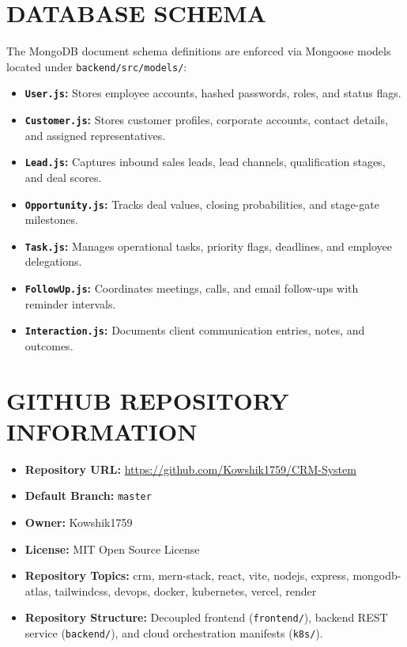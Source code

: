 \chapter{DATABASE SCHEMA}
\label{app:schema}

The MongoDB document schema definitions are enforced via Mongoose models located under \texttt{backend/src/models/}:
\begin{itemize}
    \item \textbf{\texttt{User.js}:} Stores employee accounts, hashed passwords, roles, and status flags.
    \item \textbf{\texttt{Customer.js}:} Stores customer profiles, corporate accounts, contact details, and assigned representatives.
    \item \textbf{\texttt{Lead.js}:} Captures inbound sales leads, lead channels, qualification stages, and deal scores.
    \item \textbf{\texttt{Opportunity.js}:} Tracks deal values, closing probabilities, and stage-gate milestones.
    \item \textbf{\texttt{Task.js}:} Manages operational tasks, priority flags, deadlines, and employee delegations.
    \item \textbf{\texttt{FollowUp.js}:} Coordinates meetings, calls, and email follow-ups with reminder intervals.
    \item \textbf{\texttt{Interaction.js}:} Documents client communication entries, notes, and outcomes.
\end{itemize}

\chapter{GITHUB REPOSITORY INFORMATION}
\label{app:github}

\begin{itemize}
    \item \textbf{Repository URL:} \url{https://github.com/Kowshik1759/CRM-System}
    \item \textbf{Default Branch:} \texttt{master}
    \item \textbf{Owner:} Kowshik1759
    \item \textbf{License:} MIT Open Source License
    \item \textbf{Repository Topics:} crm, mern-stack, react, vite, nodejs, express, mongodb-atlas, tailwindcss, devops, docker, kubernetes, vercel, render
    \item \textbf{Repository Structure:} Decoupled frontend (\texttt{frontend/}), backend REST service (\texttt{backend/}), and cloud orchestration manifests (\texttt{k8s/}).
\end{itemize}

